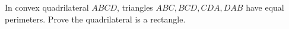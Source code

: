 In convex quadrilateral $ABCD$, triangles $ABC,BCD,CDA,DAB$ have equal perimeters. Prove the quadrilateral is a rectangle.
